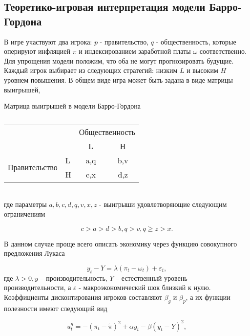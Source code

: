 
\subsection{Теоретико-игровая интерпретация модели Барро-Гордона}

В игре участвуют два игрока: $p$ - правительство, $q$ - общественность, которые оперируют инфляцией $\pi$  и индексированием заработной платы $\omega$ соответственно. Для упрощения модели положим, что оба не могут прогнозировать будущие. Каждый игрок выбирает из следующих стратегий: низким $L$  и высоким  $H$ уровнем повышения. В общем виде игра может быть задана в виде матрицы выигрышей, 
\begin{table}[h]
	\centering
	\caption{}
\footnotesize Матрица выигрышей в модели Барро-Гордона\\
\normalsize
\begin{tabular}{|l|l|c|c|}
	\hline
	\multicolumn{2}{|l|}{\multirow{2}{*}{}} & \multicolumn{2}{l|}{Общественность} \\ \cline{3-4} 
	\multicolumn{2}{|l|}{}                  & L                & H                \\ \hline
	\multirow{2}{*}{Правительство}    & L   & a,q              & b,v              \\ \cline{2-4} 
	& H   & c,x              & d,z              \\ \hline
\end{tabular}
\end{table}\\
где параметры $a,b,c,d,q,v,x,z$  - выигрыши удовлетворяющие следующим ограничениям~\cite{libich2008macroeconomic}

\begin{equation}
c>a>d>b, q>v, q\geqslant z>x.
\label{eq:sec:ot:restrictions}
\end{equation}

В данном случае проще всего описать экономику через функцию совокупного предложения Лукаса~\cite{libichIncorpo}

\begin{equation}
\label{eq:sec:ot:lucas}
y_t - Y = \lambda(\pi_t - \omega_t)+\varepsilon_t,
\end{equation}
где  $\lambda>0, y$  – производительность, $Y$ – естественный уровень производительности, а  $\varepsilon$ - макроэкономический шок близкий к нулю. Коэффициенты дисконтирования игроков составляют $\beta_g$ и $\beta_p$, а их функции  полезности  имеют следующий вид 

\begin{equation}
\label{eq:sec:ot:govUtil}
u^g_t=-(\pi_t - \tilde{\pi})^2 + \alpha y_t - \beta(y_t-Y)^2,
\end{equation}

